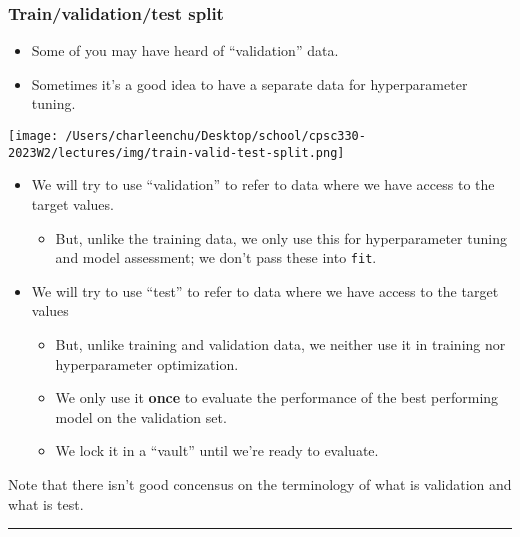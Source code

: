 \documentclass[11pt]{article}
\providecommand{\tightlist}{%
      \setlength{\itemsep}{0pt}\setlength{\parskip}{0pt}}
\begin{document}
    \subsubsection{Train/validation/test
split}\label{trainvalidationtest-split}

\begin{itemize}
\tightlist
\item
  Some of you may have heard of ``validation'' data.
\item
  Sometimes it's a good idea to have a separate data for hyperparameter
  tuning.
\end{itemize}

\texttt{[image: /Users/charleenchu/Desktop/school/cpsc330-2023W2/lectures/img/train-valid-test-split.png]}

    \begin{itemize}
\tightlist
\item
  We will try to use ``validation'' to refer to data where we have
  access to the target values.

  \begin{itemize}
  \tightlist
  \item
    But, unlike the training data, we only use this for hyperparameter
    tuning and model assessment; we don't pass these into
    \texttt{fit}.\\
  \end{itemize}
\item
  We will try to use ``test'' to refer to data where we have access to
  the target values

  \begin{itemize}
  \tightlist
  \item
    But, unlike training and validation data, we neither use it in
    training nor hyperparameter optimization.
  \item
    We only use it \textbf{once} to evaluate the performance of the best
    performing model on the validation set.\\
  \item
    We lock it in a ``vault'' until we're ready to evaluate.
  \end{itemize}
\end{itemize}

Note that there isn't good concensus on the terminology of what is
validation and what is test.

    \begin{center}\rule{0.5\linewidth}{0.5pt}\end{center}
\end{document}
